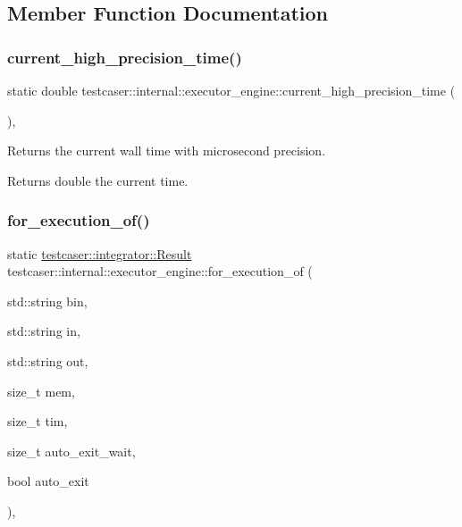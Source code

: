 \subsection{Member Function Documentation}
\mbox{\label{structtestcaser_1_1internal_1_1executor__engine_af3546e4b21e46fc05bb38f014a88ed6f}} 
\subsubsection{\texorpdfstring{current\_high\_precision\_time()}{current\_high\_precision\_time()}}
{\footnotesize\ttfamily static double testcaser\+::internal\+::executor\+\_\+engine\+::current\+\_\+high\+\_\+precision\+\_\+time (\begin{DoxyParamCaption}{ }\end{DoxyParamCaption})\hspace{0.3cm}{\ttfamily [inline]}, {\ttfamily [static]}}



Returns the current wall time with microsecond precision. 

\begin{DoxyReturn}{Returns}
double the current time. 
\end{DoxyReturn}
\mbox{\label{structtestcaser_1_1internal_1_1executor__engine_a51f467bc2013c188b5e4454fa919ea70}} 
\subsubsection{\texorpdfstring{for\_execution\_of()}{for\_execution\_of()}}
{\footnotesize\ttfamily static \mbox{\hyperlink{classtestcaser_1_1integrator_1_1Result}{testcaser\+::integrator\+::\+Result}} testcaser\+::internal\+::executor\+\_\+engine\+::for\+\_\+execution\+\_\+of (\begin{DoxyParamCaption}\item[{std\+::string}]{bin,  }\item[{std\+::string}]{in,  }\item[{std\+::string}]{out,  }\item[{size\+\_\+t}]{mem,  }\item[{size\+\_\+t}]{tim,  }\item[{size\+\_\+t}]{auto\+\_\+exit\+\_\+wait,  }\item[{bool}]{auto\+\_\+exit }\end{DoxyParamCaption})\hspace{0.3cm}{\ttfamily [inline]}, {\ttfamily [static]}}



